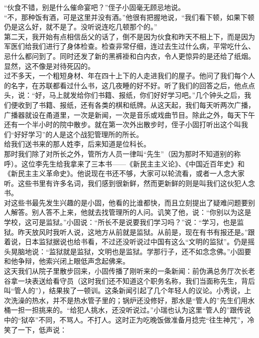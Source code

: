 “伙食不错，别是什么催命宴吧？”侄子小固毫无顾忌地说。\\

“不，那种饭有酒，可是这里并没有酒。”他很有把握地说，“我们看下顿，如果下顿仍是这么好，就不是了。没听说连吃几顿那个的。”\\

第二天，我开始有点相信岳父的话了，倒不是因为伙食和昨天不相上下，而是因为军医们给我们进行了身体检查。检查非常仔细，连过去生过什么病，平常吃什么、忌什么都问到了。同时还发了新的黑裤褂和白内衣，令人更惊异的是还给了纸烟。显然，这不像是对待死囚的。\\

过不多天，一个粗短身材、年在四十上下的人走进我们的屋子。他问了我们每个人的名字，在苏联都看过什么书，这几夜睡的好不好。听了我们的回答之后，他点点头，说：“好，马上就发给你们书籍、报纸，你们好好学习吧。”几个钟头之后，我们便收到了书籍、报纸，还有各类的棋和纸牌。从这天起，我们每天听两次广播，广播器就设在甬道里，一次是新闻，一次是音乐或戏曲节目。除此之外，每天下午还有一个半小时的院中散步。就在第一次外出散步时，侄子小固打听出这个叫我们“好好学习”的人是这个战犯管理所的所长。\\

给我们送书来的那人姓李，后来知道是位科长。\\

那时我们除了对所长之外，管所方人员一律叫“先生”（因为那时不知道别的称呼）。这位李先生给我拿来了三本书——《新民主主义论》、《中国近百年史》和《新民主主义革命史》。他说现在书还不够，大家可以轮流看，或者一人念大家听。这些书里有许多名词，我们感到很新鲜，然而更新鲜的则是叫我们这伙犯人念书。\\

对这些书最先发生兴趣的是小固，他看的比谁都快，而且立刻提出了疑难问题要别人解答。别人答不上来，他就去找管理所的人问。讥笑了他，说：“你别以为这是学校，这可是监狱。”小固说：“所长不是说要我们学习吗？”说：“学习，也是监狱。昨天放风时我听人说，这地方从前就是监狱。从前是，现在有书有报还是。”跟着说，日本监狱据说也给书看，不过还没听说过中国有这么“文明的监狱”。仍是摇头晃脑地说：“监狱就是监狱，文明也是监狱。学那行子，还不如念念佛。”小固要和他争辩，他索兴闭上眼低声念起佛来。\\

这天我们从院子里散步回来，小固传播了刚听来的一条新闻：前伪满总务厅次长老谷拿一块表送给看守员（这时我们还不知道这个职务名称，我们当面称先生，背后叫“管人的”），结果挨了一顿训。这条新闻引起了几个年轻人的议论。小秀说，上次洗澡的热水，并不是热水管子里的；锅炉还没修好，那水是“管人的”先生们用水桶一担一担挑来的。“给犯人挑水，还没听说过。”小瑞也认为这里“管人的”跟传说中的“狱卒”不同，不骂人。不打人。这时正为吃晚饭做准备月捻完“往生神咒”，冷笑了一下，低声说：\\

